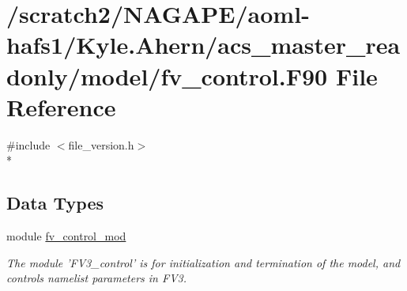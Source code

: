 \section{/scratch2/\-N\-A\-G\-A\-P\-E/aoml-\/hafs1/\-Kyle.Ahern/acs\-\_\-master\-\_\-readonly/model/fv\-\_\-control.F90 File Reference}
\label{fv__control_8F90}
{\ttfamily \#include $<$file\-\_\-version.\-h$>$}\\*
\subsection*{Data Types}
\begin{DoxyCompactItemize}
\item 
module \hyperlink{classfv__control__mod}{fv\-\_\-control\-\_\-mod}
\begin{DoxyCompactList}\small\item\em The module 'F\-V3\-\_\-control' is for initialization and termination of the model, and controls namelist parameters in F\-V3. \end{DoxyCompactList}\end{DoxyCompactItemize}
